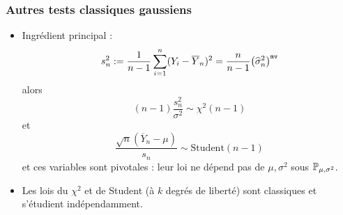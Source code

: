 \begin{frame}
\frametitle{Autres tests classiques gaussiens}
\begin{itemize}
\item \alert{Ingrédient principal} :
$$s_n^2:=\frac{1}{n-1}\sum_{i = 1}^n (Y_i-\overline{Y}_n)^2 = \frac{n}{n-1}\big(\widehat \sigma^2_n\big)^{{\tt mv}}$$
alors
$$(n-1)\frac{s_n^2}{\sigma^2} \sim \chi^2(n-1)$$
et
$$\frac{\sqrt{n}(\overline{Y}_n-\mu)}{s_n} \sim \text{Student}(n-1)$$
et ces variables sont \alert{pivotales} : leur loi ne dépend pas de $\mu,\sigma^2$ sous $\operatorname{{\mathbb P}}_{\mu,\sigma^2}$.
\item Les lois du \alert{$\chi^2$} et de \alert{Student} (à $k$ degrés de liberté) sont classiques et s'étudient indépendamment.
\end{itemize}
\end{frame}



